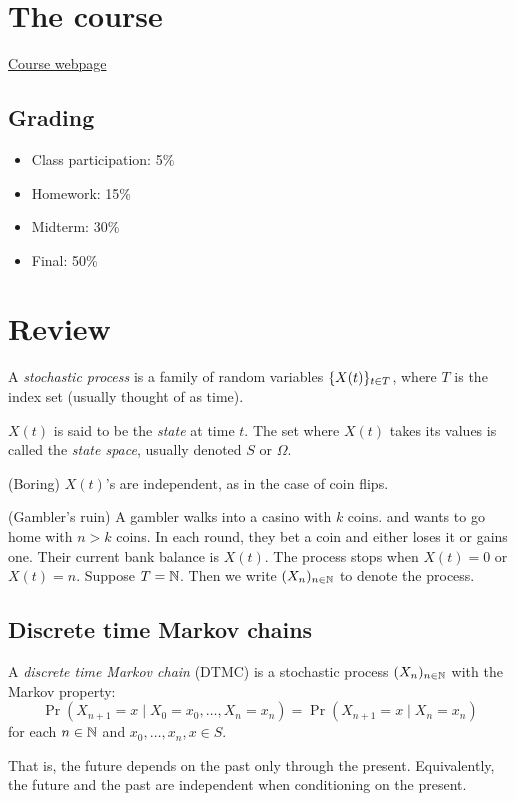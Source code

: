 \chapter*{The course} \label{chp:course}

\href{https://math.iisc.ac.in/~arvind/ma368a}{Course webpage}

\section*{Grading} \label{sec:grading}
\begin{itemize}
    \item Class participation: 5\%
    \item Homework: 15\%
    \item Midterm: 30\%
    \item Final: 50\%
\end{itemize}

\chapter{Review} \label{chp:review}
\begin{definition} \label{def:stoch}
    A \emph{stochastic process} is a family of random variables
    $\{X(t)\}_{t \in T}$, where $T$ is the index set
    (usually thought of as time).

    $X(t)$ is said to be the \emph{state} at time $t$.
    The set where $X(t)$ takes its values is called the \emph{state space},
    usually denoted $S$ or $\Omega$.
\end{definition}

\begin{examples}
    \item (Boring) $X(t)$'s are independent, as in the case of coin flips.
    \item (Gambler's ruin) A gambler walks into a casino with $k$ coins.
        and wants to go home with $n > k$ coins.
        In each round, they bet a coin and either loses it or gains one.
        Their current bank balance is $X(t)$.
        The process stops when $X(t) = 0$ or $X(t) = n$.
        Suppose $T = \mathbb{N}$.
        Then we write $(X_n)_{n \in \mathbb{N}}$ to denote the process.
\end{examples}

\section{Discrete time Markov chains} \label{sec:dtmc}
\begin{definition*}[DTMC] \label{def:dtmc}
    A \emph{discrete time Markov chain} (DTMC) is a stochastic process
    $(X_n)_{n \in \mathbb{N}}$ with the Markov property: \[
        \Pr(X_{n+1} = x \mid X_0 = x_0, \dots, X_n = x_n)
            = \Pr(X_{n+1} = x \mid X_n = x_n)
    \] for each $n \in \mathbb{N}$ and $x_0, \dots, x_n, x \in S$.
\end{definition*}
That is, the future depends on the past only through the present.
Equivalently, the future and the past are independent when conditioning on
the present.

